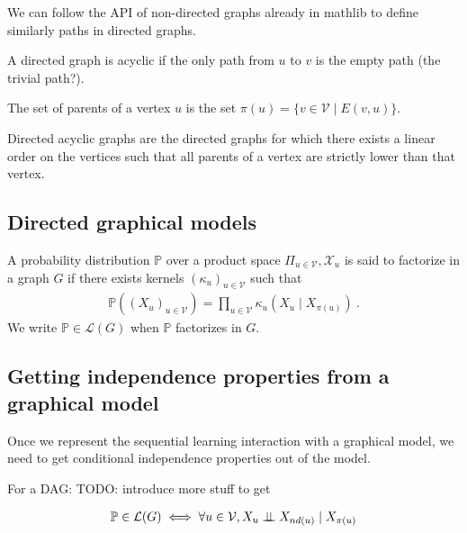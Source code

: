 We can follow the API of non-directed graphs already in mathlib to define similarly paths in directed graphs.

A directed graph is acyclic if the only path from $u$ to $v$ is the empty path (the trivial path?).

The set of parents of a vertex $u$ is the set $\pi(u) = \{v \in \mathcal V \mid E(v, u)\}$.

\begin{theorem}
Directed acyclic graphs are the directed graphs for which there exists a linear order on the vertices such that all parents of a vertex are strictly lower than that vertex.
\end{theorem}

\subsection{Directed graphical models} %
\label{sub:directed_graphical_models}

A probability distribution $\mathbb{P}$ over a product space $\Pi_{u \in \mathcal V}, \mathcal X_u$ is said to factorize in a graph $G$ if there exists kernels $(\kappa_u)_{u \in \mathcal V}$ such that
\begin{align*}
\mathbb{P}((X_u)_{u \in \mathcal V}) = \prod_{u \in \mathcal V} \kappa_u(X_u \mid X_{\pi(u)}) \: .
\end{align*}
We write $\mathbb{P} \in \mathcal L(G)$ when $\mathbb{P}$ factorizes in $G$.




\subsection{Getting independence properties from a graphical model}
\label{sub:getting_independence_properties_from_a_graphical_model}

Once we represent the sequential learning interaction with a graphical model, we need to get conditional independence properties out of the model.

For a DAG: TODO: introduce more stuff to get
\begin{theorem}
\begin{align*}
\mathbb{P} \in \mathcal L(G) \iff \forall u \in \mathcal V, X_u \perp \!\!\! \perp X_{nd(u)} \mid X_{\pi(u)}
\end{align*}
\end{theorem}
